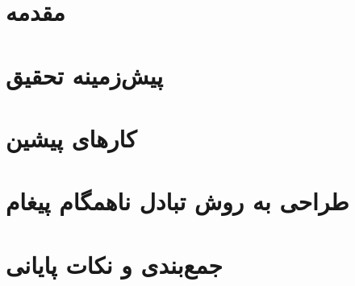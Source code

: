 \documentclass[oneside, a4paper,11pt]{book}
\numberwithin{equation}{chapter}
\numberwithin{table}{chapter}
\numberwithin{figure}{chapter}
\numberwithin{equation}{chapter}
\begin{document}
\setcounter{page}{1}

\chapter{مقدمه}
\label{chapter:Introduction}
\thispagestyle{plain}

\chapter{پیش‌زمینه تحقیق}
\label{chapter:Preliminaries}
\thispagestyle{plain}

\chapter{کارهای پیشین}
\label{chapter:RelatedWork}
\thispagestyle{plain}

\chapter{طراحی به روش تبادل ناهمگام پیغام}
\label{chapter:proposedFramework}

%
\chapter{جمع‌بندی و نکات پایانی}
\label{chapter:Conclusion}
\thispagestyle{plain}


%
\newpage

\linespread{1.2}

\small{

\clearpage
{}
{}

}

\newpage
\begin{multicols}{2}
\def\glossaryname{واژه‌نامه‌ی فارسی به انگلیسی}
\printglossary
{}
\end{multicols}
\end{document}
